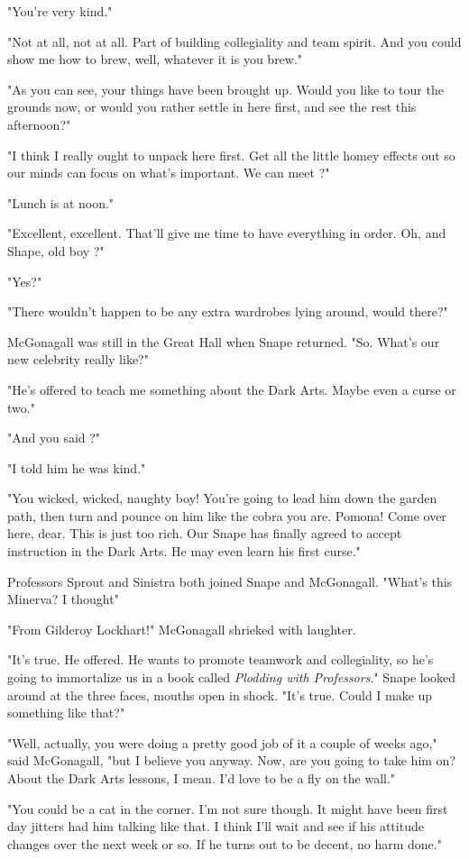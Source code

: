 "You're very kind."

"Not at all, not at all. Part of building collegiality and team spirit. And you could show me how to brew, well, whatever it is you brew."

"As you can see, your things have been brought up. Would you like to tour the grounds now, or would you rather settle in here first, and see the rest this afternoon?"

"I think I really ought to unpack here first. Get all the little homey effects out so our minds can focus on what's important. We can meet{\el} ?"

"Lunch is at noon."

"Excellent, excellent. That'll give me time to have everything in order. Oh, and Shape, old boy{\el} ?"

"Yes?"

"There wouldn't happen to be any extra wardrobes lying around, would there?"

McGonagall was still in the Great Hall when Snape returned. "So. What's our new celebrity really like?"

"He's offered to teach me something about the Dark Arts. Maybe even a curse or two."

"And you said{\el} ?"

"I told him he was kind."

"You wicked, wicked, naughty boy! You're going to lead him down the garden path, then turn and pounce on him like the cobra you are. Pomona! Come over here, dear. This is just too rich. Our Snape has finally agreed to accept instruction in the Dark Arts. He may even learn his first curse."

Professors Sprout and Sinistra both joined Snape and McGonagall. "What's this Minerva? I thought{\el}"

"From Gilderoy Lockhart!" McGonagall shrieked with laughter.

"It's true. He offered. He wants to promote teamwork and collegiality, so he's going to immortalize us in a book called \emph{Plodding with Professors}." Snape looked around at the three faces, mouths open in shock. "It's true. Could I make up something like that?"

"Well, actually, you were doing a pretty good job of it a couple of weeks ago," said McGonagall, "but I believe you anyway. Now, are you going to take him on? About the Dark Arts lessons, I mean. I'd love to be a fly on the wall."

"You could be a cat in the corner. I'm not sure though. It might have been first day jitters had him talking like that. I think I'll wait and see if his attitude changes over the next week or so. If he turns out to be decent, no harm done."


